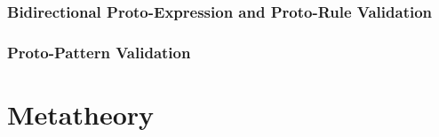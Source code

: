\subsubsection{Bidirectional Proto-Expression and Proto-Rule Validation}

\subsubsection{Proto-Pattern Validation}

\section{Metatheory}



